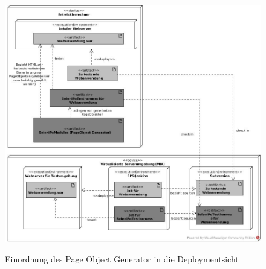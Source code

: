 \begin{figure}[htb]
  \centering  
  \includegraphics[scale=0.45]{img/Deployment.jpg}\\
  \caption{Einordnung des Page Object Generator in die Deploymentsicht}
  \label{fig:deployment}
\end{figure}

